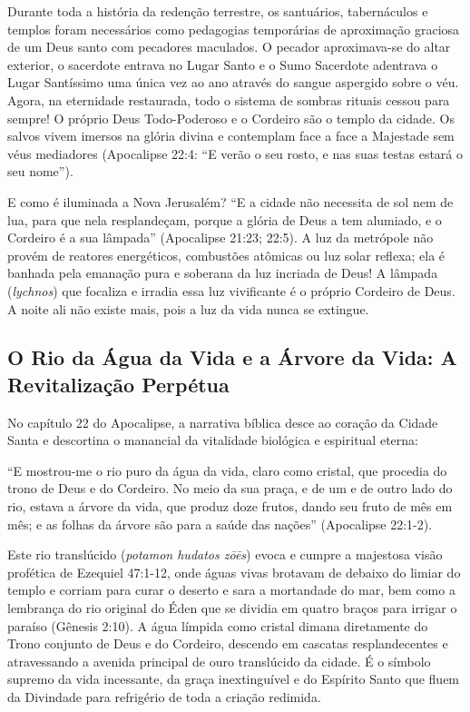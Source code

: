 \documentclass[11pt,a4paper,openany]{book}
\begin{document}
Durante toda a história da redenção terrestre, os santuários, tabernáculos e templos foram necessários como pedagogias temporárias de aproximação graciosa de um Deus santo com pecadores maculados. O pecador aproximava-se do altar exterior, o sacerdote entrava no Lugar Santo e o Sumo Sacerdote adentrava o Lugar Santíssimo uma única vez ao ano através do sangue aspergido sobre o véu.
Agora, na eternidade restaurada, todo o sistema de sombras rituais cessou para sempre! O próprio Deus Todo-Poderoso e o Cordeiro são o templo da cidade. Os salvos vivem imersos na glória divina e contemplam face a face a Majestade sem véus mediadores (Apocalipse 22:4: ``E verão o seu rosto, e nas suas testas estará o seu nome'').

E como é iluminada a Nova Jerusalém?
``E a cidade não necessita de sol nem de lua, para que nela resplandeçam, porque a glória de Deus a tem alumiado, e o Cordeiro é a sua lâmpada'' (Apocalipse 21:23; 22:5).
A luz da metrópole não provém de reatores energéticos, combustões atômicas ou luz solar reflexa; ela é banhada pela emanação pura e soberana da luz incriada de Deus! A lâmpada (\textit{lychnos}) que focaliza e irradia essa luz vivificante é o próprio Cordeiro de Deus. A noite ali não existe mais, pois a luz da vida nunca se extingue.



\subsection{O Rio da Água da Vida e a Árvore da Vida: A Revitalização Perpétua}


No capítulo 22 do Apocalipse, a narrativa bíblica desce ao coração da Cidade Santa e descortina o manancial da vitalidade biológica e espiritual eterna:

``E mostrou-me o rio puro da água da vida, claro como cristal, que procedia do trono de Deus e do Cordeiro. No meio da sua praça, e de um e de outro lado do rio, estava a árvore da vida, que produz doze frutos, dando seu fruto de mês em mês; e as folhas da árvore são para a saúde das nações'' (Apocalipse 22:1-2).

Este rio translúcido (\textit{potamon hudatos zōēs}) evoca e cumpre a majestosa visão profética de Ezequiel 47:1-12, onde águas vivas brotavam de debaixo do limiar do templo e corriam para curar o deserto e sara a mortandade do mar, bem como a lembrança do rio original do Éden que se dividia em quatro braços para irrigar o paraíso (Gênesis 2:10).
A água límpida como cristal dimana diretamente do Trono conjunto de Deus e do Cordeiro, descendo em cascatas resplandecentes e atravessando a avenida principal de ouro translúcido da cidade. É o símbolo supremo da vida incessante, da graça inextinguível e do Espírito Santo que fluem da Divindade para refrigério de toda a criação redimida.
\end{document}
